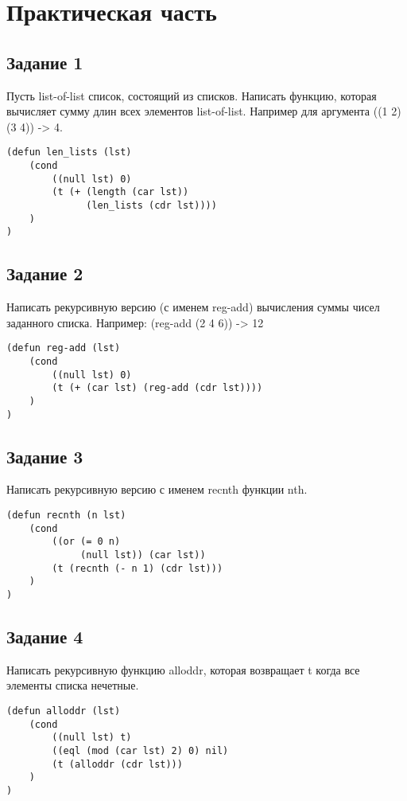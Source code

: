 \chapter{Практическая часть}

\section{Задание \No{}1}
Пусть list-of-list список, состоящий из списков. Написать функцию, которая вычисляет сумму длин всех элементов list-of-list.
Например для аргумента ((1 2) (3 4)) -> 4.

\begin{lstlisting}
(defun len_lists (lst)
    (cond
        ((null lst) 0)
        (t (+ (length (car lst))
              (len_lists (cdr lst))))
    )
)
\end{lstlisting}

\section{Задание \No{}2}
Написать рекурсивную версию (с именем reg-add) вычисления суммы чисел
заданного списка.
Например: (reg-add (2 4 6)) -> 12

\begin{lstlisting}
(defun reg-add (lst)
    (cond
        ((null lst) 0)
        (t (+ (car lst) (reg-add (cdr lst))))
    )
)
\end{lstlisting}

\section{Задание \No{}3}
Написать рекурсивную версию с именем recnth функции nth.

\begin{lstlisting}
(defun recnth (n lst)
    (cond
        ((or (= 0 n)
             (null lst)) (car lst))
        (t (recnth (- n 1) (cdr lst)))
    )
)
\end{lstlisting}

\section{Задание \No{}4}
Написать рекурсивную функцию alloddr, которая возвращает t когда все
элементы списка нечетные.

\begin{lstlisting}
(defun alloddr (lst)
    (cond
        ((null lst) t)
        ((eql (mod (car lst) 2) 0) nil)
        (t (alloddr (cdr lst)))
    )
)
\end{lstlisting}

